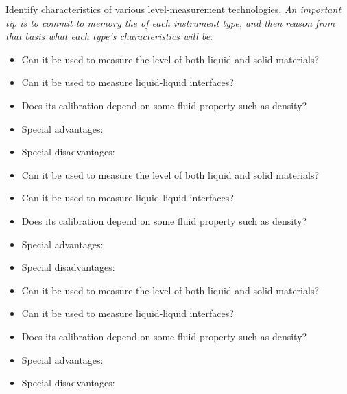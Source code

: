 

Identify characteristics of various level-measurement technologies.  {\it An important tip is to commit to memory the  of each instrument type, and then reason from that basis what each type's characteristics will be}:

\vskip 10pt

\begin{itemize}
\item{} Can it be used to measure the level of both liquid and solid materials?
\item{} Can it be used to measure liquid-liquid interfaces?
\item{} Does its calibration depend on some fluid property such as density?
\item{} Special advantages:
\item{} Special disadvantages:
\end{itemize}

\vskip 10pt

\begin{itemize}
\item{} Can it be used to measure the level of both liquid and solid materials?
\item{} Can it be used to measure liquid-liquid interfaces?
\item{} Does its calibration depend on some fluid property such as density?
\item{} Special advantages:
\item{} Special disadvantages:
\end{itemize}

\vskip 10pt

\begin{itemize}
\item{} Can it be used to measure the level of both liquid and solid materials?
\item{} Can it be used to measure liquid-liquid interfaces?
\item{} Does its calibration depend on some fluid property such as density?
\item{} Special advantages:
\item{} Special disadvantages:
\end{itemize}

